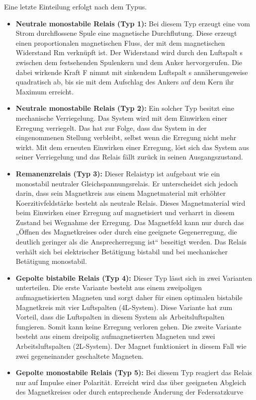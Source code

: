 Eine letzte Einteilung erfolgt nach dem Typus.
\begin{itemize}
	\item \textbf{Neutrale monostabile Relais (Typ 1):} Bei diesem Typ erzeugt eine vom Strom durchflossene Spule eine magnetische Durchflutung. Diese erzeugt einen proportionalen magnetischen Fluss, der mit dem magnetischen Widerstand Rm verknüpft ist. Der Widerstand wird durch den Luftspalt s zwischen dem festsehenden Spulenkern und dem Anker hervorgerufen. Die dabei wirkende Kraft F nimmt mit sinkendem Luftspalt s annäherungsweise quadratisch ab, bis sie mit dem Aufschlag des Ankers auf dem Kern ihr Maximum erreicht.
	\item \textbf{Neutrale monostabile Relais (Typ 2):} Ein solcher Typ besitzt eine mechanische Verriegelung. Das System wird mit dem Einwirken einer Erregung verriegelt. Das hat zur Folge, dass das System in der eingenommenen Stellung verbleibt, selbst wenn die Erregung nicht mehr wirkt. Mit dem erneuten Einwirken einer Erregung, löst sich das System aus seiner Verriegelung und das Relais fällt zurück in seinen Ausgangszustand.
	\item \textbf{Remanenzrelais (Typ 3):} Dieser Relaistyp ist aufgebaut wie ein monostabil neutraler Gleichspannungsrelais. Er unterscheidet sich jedoch darin, dass sein Magnetkreis aus einem Magnetmaterial mit erhöhter Koerzitivfeldstärke besteht als neutrale Relais. Dieses Magnetmaterial wird beim Einwirken einer Erregung auf magnetisiert und verharrt in diesem Zustand bei Wegnahme der Erregung. Das Magnetfeld kann nur durch das „Öffnen des Magnetkreises oder durch eine geeignete Gegenerregung, die deutlich geringer als die Ansprecherregung ist“ beseitigt werden. Das Relais verhält sich bei elektrischer Betätigung bistabil und bei mechanischer Betätigung monostabil.
	\item \textbf{Gepolte bistabile Relais (Typ 4):} Dieser Typ lässt sich in zwei Varianten unterteilen. Die erste Variante besteht aus einem zweipoligen aufmagnetisierten Magneten und sorgt daher für einen optimalen bistabile Magnetkreis mit vier Luftspalten (4L-System). Diese Variante hat zum Vorteil, dass die Luftspalten in diesem System als Arbeitsluftspalten fungieren. Somit kann keine Erregung verloren gehen. 
	Die zweite Variante besteht aus einem dreipolig aufmagnetiserten Magneten und zwei Arbeitsluftspalten (2L-System). Der Magnet funktioniert in diesem Fall wie zwei gegeneinander geschaltete Magneten.
	\item \textbf{Gepolte monostabile Relais (Typ 5):} Bei diesem Typ reagiert das Relais nur auf Impulse einer Polarität. Erreicht wird das über geeigneten Abgleich des Magnetkreises oder durch entsprechende Änderung der Federsatzkurve 
\end{itemize}
\cite{Schlaak:2006}

